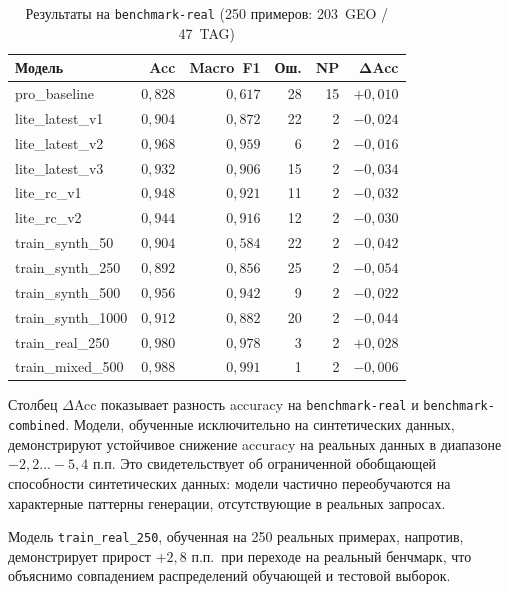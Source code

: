 \begin{table}[H]
\centering
\caption{Результаты на \texttt{benchmark-real} (250 примеров: 203~GEO / 47~TAG)}
\label{tab:real_results}
\def\arraystretch{1.15}
\setlength\tabcolsep{0.35em}
\begin{tabular}{l r r r r r}
    \toprule
    \textbf{Модель} & \textbf{Acc} & \textbf{Macro~F1} & \textbf{Ош.} & \textbf{NP} & $\boldsymbol{\Delta}$\textbf{Acc} \\
    \midrule
    pro\_baseline       & $0{,}828$ & $0{,}617$ & 28 & 15 & $+0{,}010$ \\
    \midrule
    lite\_latest\_v1    & $0{,}904$ & $0{,}872$ & 22 &  2 & $-0{,}024$ \\
    lite\_latest\_v2    & $0{,}968$ & $0{,}959$ &  6 &  2 & $-0{,}016$ \\
    lite\_latest\_v3    & $0{,}932$ & $0{,}906$ & 15 &  2 & $-0{,}034$ \\
    \midrule
    lite\_rc\_v1        & $0{,}948$ & $0{,}921$ & 11 &  2 & $-0{,}032$ \\
    lite\_rc\_v2        & $0{,}944$ & $0{,}916$ & 12 &  2 & $-0{,}030$ \\
    \midrule
    train\_synth\_50    & $0{,}904$ & $0{,}584$ & 22 &  2 & $-0{,}042$ \\
    train\_synth\_250   & $0{,}892$ & $0{,}856$ & 25 &  2 & $-0{,}054$ \\
    train\_synth\_500   & $0{,}956$ & $0{,}942$ &  9 &  2 & $-0{,}022$ \\
    train\_synth\_1000  & $0{,}912$ & $0{,}882$ & 20 &  2 & $-0{,}044$ \\
    \midrule
    train\_real\_250    & $0{,}980$ & $0{,}978$ &  3 &  2 & $+0{,}028$ \\
    train\_mixed\_500   & $0{,}988$ & $0{,}991$ &  1 &  2 & $-0{,}006$ \\
    \bottomrule
\end{tabular}
\end{table}

Столбец $\Delta$Acc показывает разность accuracy на \texttt{benchmark-real} и \texttt{benchmark-combined}. Модели, обученные исключительно на синтетических данных, демонстрируют устойчивое снижение accuracy на реальных данных в диапазоне $-2{,}2\ldots-5{,}4$ п.п. Это свидетельствует об ограниченной обобщающей способности синтетических данных: модели частично переобучаются на характерные паттерны генерации, отсутствующие в реальных запросах.

Модель \texttt{train\_real\_250}, обученная на 250 реальных примерах, напротив, демонстрирует прирост $+2{,}8$ п.п.\ при переходе на реальный бенчмарк, что объяснимо совпадением распределений обучающей и тестовой выборок.

